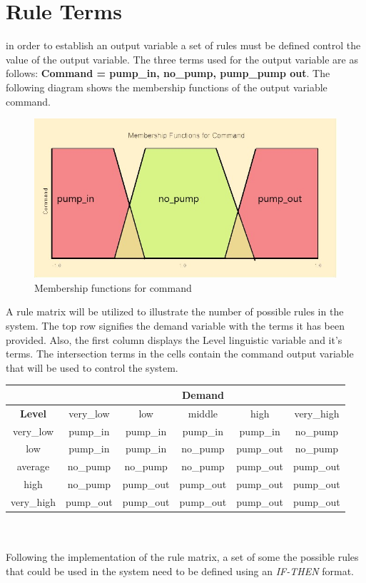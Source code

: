 \newpage

\section*{Rule Terms}
in order to establish an output variable a set of rules must be defined control the value of the output variable. The three terms used for the output variable are as follows: \textbf{Command = {pump\_in, no\_pump, pump\_pump out}}. The following diagram shows the membership functions of the output variable command.
\begin{figure}[ht]
	\begin{center}
		\advance\leftskip-3cm
		\advance\rightskip-3cm
		\includegraphics[keepaspectratio=true,scale=0.6]{__resources/command.jpg}
		\caption{Membership functions for command}
		\label{member2}
	\end{center}
\end{figure}
\newpage
A rule matrix will be utilized to illustrate the number of possible rules in the system. The top row signifies the demand variable with the terms it has been provided. Also, the first column displays the Level linguistic variable and it's terms. The intersection terms in the cells contain the command output variable that will be used to control the system.\\

\begin{tabular}{|c|c|c|c|c|c|}
	\hline 
	& \multicolumn{5}{c|}{\textbf{Demand}} \\ 
	\hline 
	\textbf{Level} & very\_low & low & middle & high & very\_high \\ 
	\hline 
	very\_low & pump\_in & pump\_in & pump\_in & pump\_in & no\_pump \\ 
	\hline 
	low & pump\_in & pump\_in & no\_pump & pump\_out & no\_pump \\ 
	\hline 
	average & no\_pump & no\_pump & no\_pump & pump\_out & pump\_out \\ 
	\hline 
	high & no\_pump & pump\_out & pump\_out & pump\_out & pump\_out \\ 
	\hline 
	very\_high & pump\_out & pump\_out & pump\_out & pump\_out & pump\_out \\ 
	\hline 
\end{tabular} \\\\
Following the implementation of the rule matrix, a set of some the possible rules that could be used in the system need to be defined using an \textit{IF-THEN} format. 


